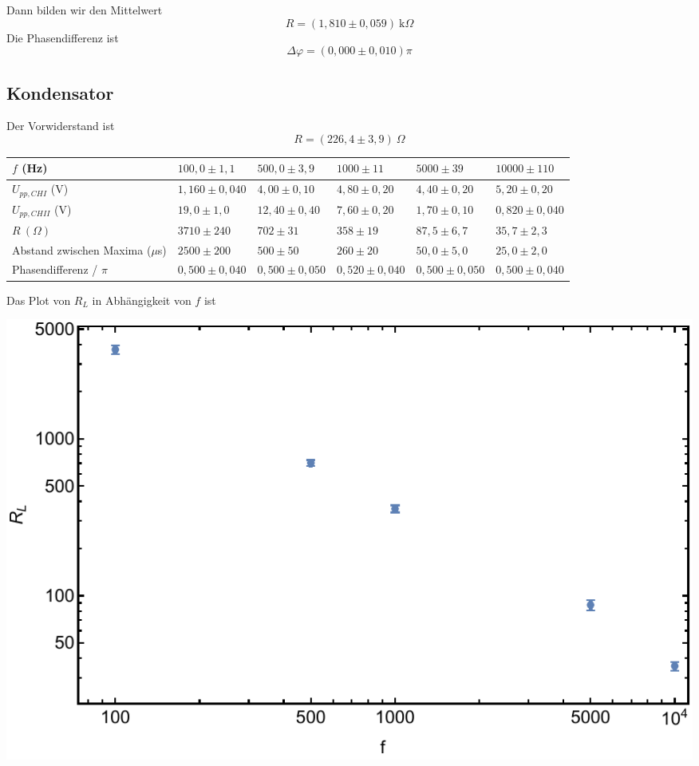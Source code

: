 \documentclass[prb,12pt]{revtex4-2}
\theoremstyle{definition}
\theoremstyle{definition}
\begin{document}
Dann bilden wir den Mittelwert
\[R=(1,810\pm 0,059)~\text{k}\Omega\]
Die Phasendifferenz ist
\[\Delta \varphi=(0,000\pm 0,010)\pi\]
\subsection{Kondensator}
Der Vorwiderstand ist
\[R=(226,4\pm 3,9)~\Omega\]
\begin{center}
	\begin{tabularx}{\textwidth}{XXXXXX}
	\toprule
	$f$ (Hz) & $100,0\pm 1,1$ & $500,0\pm 3,9$ & $1000\pm 11$ & $5000\pm 39$ & $10000\pm 110$\\\midrule
	$U_{pp,CHI}$ (V) & $1,160\pm 0,040$ & $4,00\pm 0,10$ & $4,80\pm 0,20$ & $4,40\pm 0,20$ & $5,20\pm 0,20$ \\\midrule
	$U_{pp,CHII}$ (V) & $19,0\pm 1,0$ & $12,40\pm 0,40$ & $7,60\pm 0,20$ & $1,70\pm 0,10$ & $0,820\pm 0,040$\\\midrule
	$R~(\Omega)$ & $3710\pm 240$ & $702\pm 31$ & $358\pm 19$ & $87,5\pm 6,7$ & $35,7\pm 2,3$\\\midrule
	Abstand zwischen Maxima ($\mu$s) & $2500\pm 200$ & $500\pm 50$ & $260\pm 20$ & $50,0\pm 5,0$ & $25,0\pm 2,0$\\\midrule
	Phasendifferenz / $\pi$ & $0,500\pm 0,040$ & $0,500\pm 0,050$ & $0,520\pm 0,040$ & $0,500\pm 0,050$ & $0,500\pm 0,040$\\\bottomrule
\end{tabularx}
\end{center}
Das Plot von $R_L$ in Abhängigkeit von $f$ ist
\begin{center}
	\includegraphics[width=	\textwidth]{plt1.pdf}
\end{center}
\end{document}
